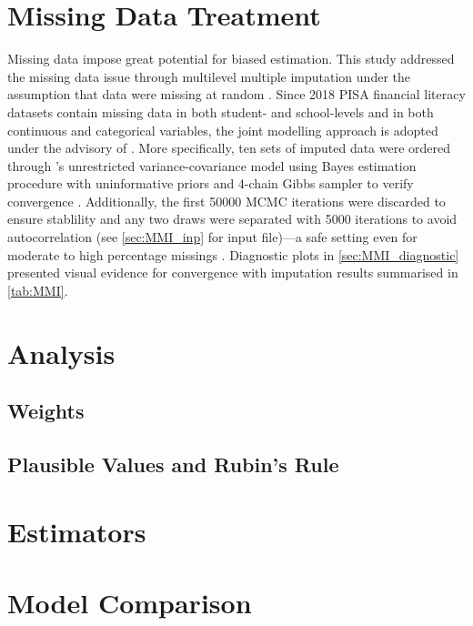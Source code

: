 \documentclass[a4paper,11pt,UKenglish,twoside,openright]{report}\usepackage[]{graphicx}\usepackage[]{color}
\begin{document}
\section{Missing Data Treatment}

Missing data impose great potential for biased estimation. This study addressed the missing data issue through multilevel multiple imputation under the assumption that data were missing at random \parencite{little:2019}. Since 2018 PISA financial literacy datasets contain missing data in both student- and school-levels and in both continuous and categorical variables, the joint modelling approach is adopted under the advisory of \textcite{grund:2018}. More specifically, ten sets of imputed data were ordered through 's unrestricted variance-covariance model \parencite[``JM-AM H1'',][]{asparouhov:2010} using Bayes estimation procedure with uninformative priors and 4-chain Gibbs sampler to verify convergence \parencite[][p. 314]{lambert:2018}. Additionally, the first 50000 MCMC iterations were discarded to ensure stablility and any two draws were separated with 5000 iterations to avoid autocorrelation (see \cref{sec:MMI_inp} for input file)---a safe setting even for moderate to high percentage missings \parencite{grund:2016}. Diagnostic plots in \cref{sec:MMI_diagnostic} presented visual evidence for convergence with imputation results summarised in \cref{tab:MMI}.

\section{Analysis}

\subsection{Weights}

\subsection{Plausible Values and Rubin's Rule}

\section{Estimators}

\section{Model Comparison}
\end{document}
